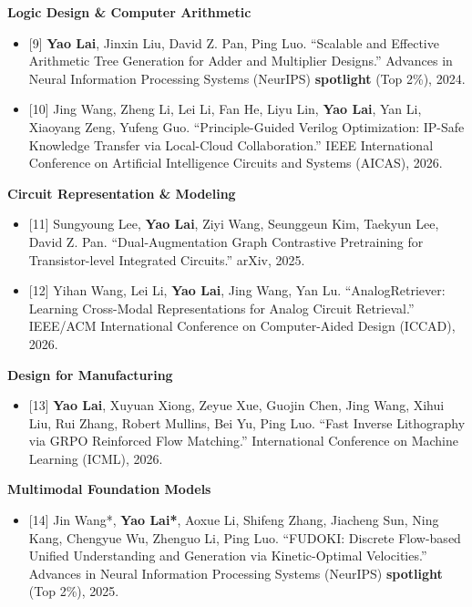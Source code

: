 \documentclass{article}
\newcommand{\resumeItemListStart}{\begin{itemize}[topsep=2pt]}
\newcommand{\resumeItemListEnd}{\end{itemize}\vspace{-5pt}}
\newif\ifshowCCF
\newcommand{\ccf}[1]{%
  \ifshowCCF
    \ifnum\pdfstrcmp{#1}{A}=0
      \resumetag{\textbf{CCF-#1}}%
    \else
      \resumetaggray{\textbf{CCF-#1}}%
    \fi
  \fi
}
\begin{document}
    \vspace{3pt}
    \item{\textbf{Logic Design \& Computer Arithmetic}}
    \resumeItemListStart
      \item{[9] \textbf{Yao Lai}, Jinxin Liu, David Z. Pan, Ping Luo. ``Scalable and Effective Arithmetic Tree Generation for Adder and Multiplier Designs.'' Advances in Neural Information Processing Systems (NeurIPS) \textbf{spotlight} (Top 2\%), 2024. \ccf{A}}
      \item{[10] Jing Wang, Zheng Li, Lei Li, Fan He, Liyu Lin, \textbf{Yao Lai}, Yan Li, Xiaoyang Zeng, Yufeng Guo. ``Principle-Guided Verilog Optimization: IP-Safe Knowledge Transfer via Local-Cloud Collaboration.'' IEEE International Conference on Artificial Intelligence Circuits and Systems (AICAS), 2026.}
    \resumeItemListEnd

    \vspace{3pt}
    \item{\textbf{Circuit Representation \& Modeling}}
    \resumeItemListStart
      \item{[11] Sungyoung Lee, \textbf{Yao Lai}, Ziyi Wang, Seunggeun Kim, Taekyun Lee, David Z. Pan. ``Dual-Augmentation Graph Contrastive Pretraining for Transistor-level Integrated Circuits.'' arXiv, 2025.}
      \item{[12] Yihan Wang, Lei Li, \textbf{Yao Lai}, Jing Wang, Yan Lu. ``AnalogRetriever: Learning Cross-Modal Representations for Analog Circuit Retrieval.'' IEEE/ACM International Conference on Computer-Aided Design (ICCAD), 2026. \ccf{B}}
    \resumeItemListEnd

    \vspace{3pt}
    \item{\textbf{Design for Manufacturing}}
    \resumeItemListStart
      \item{[13] \textbf{Yao Lai}, Xuyuan Xiong, Zeyue Xue, Guojin Chen, Jing Wang, Xihui Liu, Rui Zhang, Robert Mullins, Bei Yu, Ping Luo. ``Fast Inverse Lithography via GRPO Reinforced Flow Matching.'' International Conference on Machine Learning (ICML), 2026. \ccf{A}}
    \resumeItemListEnd

    \vspace{3pt}
    \item{\textbf{Multimodal Foundation Models}}
    \resumeItemListStart
      \item{[14] Jin Wang*, \textbf{Yao Lai*}, Aoxue Li, Shifeng Zhang, Jiacheng Sun, Ning Kang, Chengyue Wu, Zhenguo Li, Ping Luo. ``FUDOKI: Discrete Flow-based Unified Understanding and Generation via Kinetic-Optimal Velocities.'' Advances in Neural Information Processing Systems (NeurIPS) \textbf{spotlight} (Top 2\%), 2025. \ccf{A}}
    \resumeItemListEnd
\end{document}
